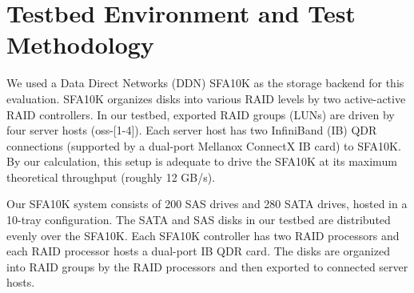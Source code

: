 \section{Testbed Environment and Test Methodology}
\label{sec:testbed}

We used a Data Direct Networks (DDN) SFA10K as the storage backend for this
evaluation. SFA10K organizes disks into various RAID levels by two
active-active RAID controllers. In our testbed, exported RAID groups (LUNs)
are driven by four server hosts (oss-[1-4]).  Each server host has two
InfiniBand (IB) QDR connections (supported by a dual-port Mellanox ConnectX IB
card) to SFA10K. By our calculation, this setup is adequate to drive the
SFA10K at its maximum theoretical throughput (roughly 12 GB/s). 

Our SFA10K system consists of 200 SAS drives and 280 SATA drives, hosted in a
10-tray configuration. 
The SATA and SAS disks in our testbed are distributed evenly over the SFA10K.
Each SFA10K controller has two RAID processors and each RAID processor hosts a
dual-port IB QDR card. The disks are organized into RAID groups by the RAID
processors and then exported to connected server hosts.

